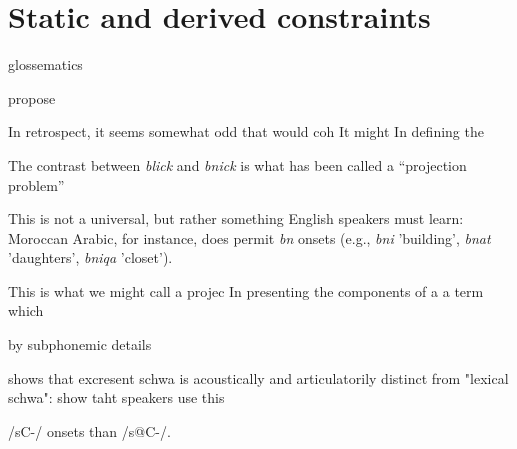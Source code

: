 \chapter{Static and derived constraints}
\label{turkish}

glossematics

\citet{Chomsky1965} propose

In retrospect, it seems somewhat odd that \citeauthor{Chomsky1965} would coh
It might 
In defining the 

The contrast between \emph{blick} and \emph{bnick} is what has been called a ``projection problem'' \citep{Baker1979}

This is not a universal, but rather something English speakers must learn: Moroccan Arabic, for instance, does permit \emph{bn} onsets (e.g., \emph{bni} 'building', \emph{bnat} 'daughters', \emph{bniqa} 'closet').

\citet{Lees1966b,Lees1966a}


This is what we might call a projec
In presenting the components of a 
a term which 

by subphonemic details

\citet{Davidson2005,Davidson2006a} shows that excresent schwa is acoustically and articulatorily distinct from "lexical schwa":
\citet{Wilson2011} show taht speakers use this 


/sC-/ onsets than /s@C-/.



\citet{Berent2007a}
\citet{Berent2007b}
\citet{Berent2008a}

\citet{Peperkamp2007}
\citet{Dupoux1999}

